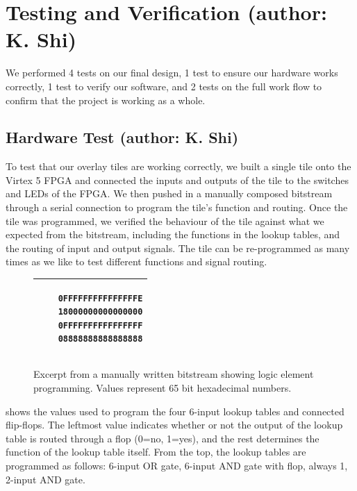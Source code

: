 \section{Testing and Verification (author: K. Shi)}

We performed 4 tests on our final design, 1 test to ensure our hardware works correctly, 1 test to verify our software, and 2 tests on the full work flow to confirm that the project is working as a whole.

\subsection{Hardware Test (author: K. Shi)}

To test that our overlay tiles are working correctly, we built a single tile onto the Virtex 5 FPGA and connected the inputs and outputs of the tile to the switches and LEDs of the FPGA.
We then pushed in a manually composed bitstream through a serial connection to program the tile's function and routing.
Once the tile was programmed, we verified the behaviour of the tile against what we expected from the bitstream, including the functions in the lookup tables, and the routing of input and output signals.
The tile can be re-programmed as many times as we like to test different functions and signal routing.

\begin{figure}[!h]
	\centering
	\begin{tabular}{|p{13cm}|}
	\hline
	\begin{verbatim}
	0FFFFFFFFFFFFFFFE
	18000000000000000
	0FFFFFFFFFFFFFFFF
	08888888888888888
	\end{verbatim}
	\\ \hline
	\end{tabular}
	\caption{Excerpt from a manually written bitstream showing logic element programming. Values represent 65 bit hexadecimal numbers.}
	\label{manual-bitstream}
\end{figure}

 shows the values used to program the four 6-input lookup tables and connected flip-flops.
The leftmost value indicates whether or not the output of the lookup table is routed through a flop (0=no, 1=yes), and the rest determines the function of the lookup table itself.
From the top, the lookup tables are programmed as follows: 6-input OR gate, 6-input AND gate with flop, always 1, 2-input AND gate.


